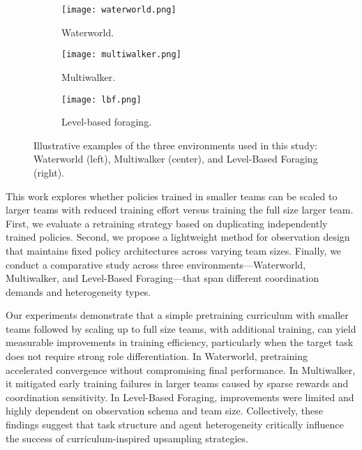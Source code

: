 \begin{figure}[ht]
    \centering
    \begin{subfigure}{0.3\textwidth}
        \texttt{[image: waterworld.png]}
        \caption{Waterworld.}
        \label{con1:fig:waterworld}
    \end{subfigure}
    \hfil
    \begin{subfigure}{0.3\textwidth}
        \texttt{[image: multiwalker.png]}
        \caption{Multiwalker.}
        \label{con1:fig:multiwalker}
    \end{subfigure}
    \hfil
    \begin{subfigure}{0.3\textwidth}
        \texttt{[image: lbf.png]}
        \caption{Level-based foraging.}
        \label{con1:fig:lbf}
    \end{subfigure}
    \caption[Environments used in \cref{ch:contribution_1}.]%
        {Illustrative examples of the three environments used in this study: 
        Waterworld (left), Multiwalker (center), and Level-Based Foraging (right).}
    \label{con1:fig:envs-overview}
\end{figure}

This work explores whether policies trained in smaller teams can be scaled to larger teams 
with reduced training effort versus training the full size larger team. First, 
we evaluate a retraining strategy based on duplicating independently trained policies. 
Second, we propose a lightweight method for observation design that maintains fixed policy 
architectures across varying team sizes. Finally, we conduct a comparative study across 
three environments—Waterworld, Multiwalker, and Level-Based Foraging—that span different 
coordination demands and heterogeneity types.

Our experiments demonstrate that a simple pretraining curriculum with smaller teams followed by 
scaling up to full size teams, with additional training, can yield measurable improvements in 
training efficiency, particularly when the target task does not require strong role 
differentiation. 
In Waterworld, pretraining accelerated convergence without compromising final performance. 
In Multiwalker, it mitigated early training failures in larger teams caused by sparse 
rewards and coordination sensitivity. 
In Level-Based Foraging, improvements were limited and highly dependent on 
observation schema and team size. 
Collectively, these findings suggest that task structure and agent heterogeneity 
critically influence the success of curriculum-inspired upsampling strategies.

